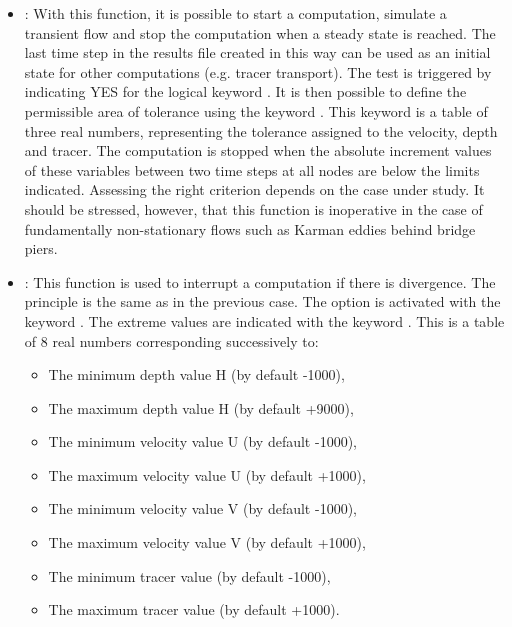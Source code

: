 \begin{itemize}
\item  {}: With this function, it is possible to start a computation, simulate a transient flow and stop the computation when a steady state is reached. The last time step in the results file created in this way can be used as an initial state for other computations (e.g. tracer transport). The test is triggered by indicating YES for the logical keyword  . It is then possible to define the permissible area of tolerance using the keyword . This keyword is a table of three real numbers, representing the tolerance assigned to the velocity, depth and tracer. The computation is stopped when the absolute increment values of these variables between two time steps at all nodes are below the limits indicated. Assessing the right criterion depends on the case under study. It should be stressed, however, that this function is inoperative in the case of fundamentally non-stationary flows such as Karman eddies behind bridge piers.

\item  {}: This function is used to interrupt a computation if there is divergence. The principle is the same as in the previous case. The option is activated with the keyword . The extreme values are indicated with the keyword . This is a table of 8 real numbers corresponding successively to:
\begin{itemize}
\item  The minimum depth value H (by default -1000),

\item  The maximum depth value H (by default +9000),

\item  The minimum velocity value U (by default -1000),

\item  The maximum velocity value U (by default +1000),

\item  The minimum velocity value V (by default -1000),

\item  The maximum velocity value V (by default +1000),

\item  The minimum tracer value (by default -1000),

\item  The maximum tracer value (by default +1000).
\end{itemize}
\end{itemize}

